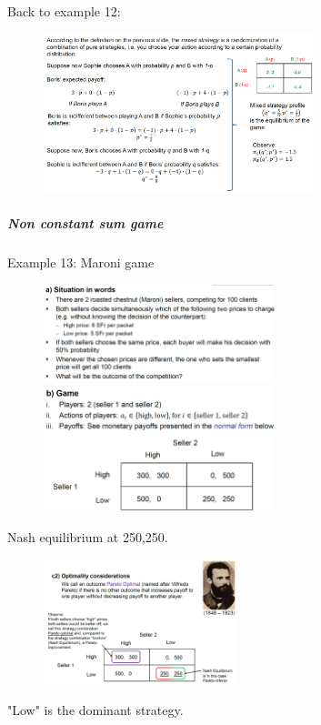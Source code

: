 Back to example 12:

\begin{figure}[H]
    \centering
    \includegraphics[width=0.7\textwidth]{Pictures/example_12_mixed_strategy.png}
\end{figure}

\subparagraph{Non constant sum game}

Example 13: Maroni game

\begin{figure}[H]
    \centering
    \includegraphics[width=0.6\textwidth]{Pictures/maroni1.png}
    \includegraphics[width=0.6\textwidth]{Pictures/maroni2.png}
\end{figure}
Nash equilibrium at 250,250.

\begin{figure}[H]
    \centering
    \includegraphics[width=0.5\textwidth]{Pictures/maroni3.png}
\end{figure}
"Low" is the dominant strategy.

